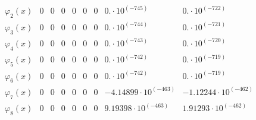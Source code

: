 \documentclass{article}
\begin{document}
\begin{landscape}
$$\begin{array}{l|llllllll}
\varphi_2(x) & 0 & 0 & 0 & 0 & 0 & 0 & 0.\cdot 10^{(-745)} & 0.\cdot 10^{(-722)} \\ 
\varphi_3(x) & 0 & 0 & 0 & 0 & 0 & 0 & 0.\cdot 10^{(-744)} & 0.\cdot 10^{(-721)} \\ 
\varphi_4(x) & 0 & 0 & 0 & 0 & 0 & 0 & 0.\cdot 10^{(-743)} & 0.\cdot 10^{(-720)} \\ 
\varphi_5(x) & 0 & 0 & 0 & 0 & 0 & 0 & 0.\cdot 10^{(-742)} & 0.\cdot 10^{(-719)} \\ 
\varphi_6(x) & 0 & 0 & 0 & 0 & 0 & 0 & 0.\cdot 10^{(-742)} & 0.\cdot 10^{(-719)} \\ 
\varphi_7(x) & 0 & 0 & 0 & 0 & 0 & 0 & -4.14899\cdot 10^{(-463)} & -1.12244\cdot 10^{(-462)} \\ 
\varphi_8(x) & 0 & 0 & 0 & 0 & 0 & 0 & 9.19398\cdot 10^{(-463)} & 1.91293\cdot 10^{(-462)} \\ 
\end{array} $$ 
\end{landscape} 
\end{document}
